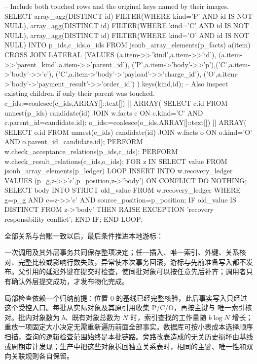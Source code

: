 \begin{BookCode}
 -- Include both touched rows and the original keys named by their images.
 SELECT array_agg(DISTINCT id) FILTER(WHERE kind='P' AND id IS NOT NULL),
        array_agg(DISTINCT id) FILTER(WHERE kind='C' AND id IS NOT NULL),
        array_agg(DISTINCT id) FILTER(WHERE kind='O' AND id IS NOT NULL)
 INTO p_ids,c_ids,o_ids
 FROM jsonb_array_elements(p_facts) a(item)
 CROSS JOIN LATERAL (VALUES
   (a.item->>'kind',a.item->>'id'),
   (a.item->>'parent_kind',a.item->>'parent_id'),
   ('P',a.item->'body'->>'p'),('C',a.item->'body'->>'c'),
   ('C',a.item->'body'->'payload'->>'charge_id'),
   ('O',a.item->'body'->'payment_result'->>'order_id')
 ) keys(kind,id);
 -- Also inspect existing children if only their parent was touched.
 c_ids:=coalesce(c_ids,ARRAY[]::text[]) || ARRAY(
   SELECT c.id FROM unnest(p_ids) candidate(id)
   JOIN w.facts c ON c.kind='C' AND c.parent_id=candidate.id);
 o_ids:=coalesce(o_ids,ARRAY[]::text[]) || ARRAY(
   SELECT o.id FROM unnest(c_ids) candidate(id)
   JOIN w.facts o ON o.kind='O' AND o.parent_id=candidate.id);
 PERFORM w.check_acceptance_relations(p_ids,c_ids);
 PERFORM w.check_result_relations(c_ids,o_ids);
 FOR z IN SELECT value FROM jsonb_array_elements(p_ledger) LOOP
   INSERT INTO w.recovery_ledger VALUES
     (p_g,z->>'c',p_position,z->'body') ON CONFLICT DO NOTHING;
   SELECT body INTO STRICT old_value FROM w.recovery_ledger
    WHERE g=p_g AND c=z->>'c' AND source_position=p_position;
   IF old_value IS DISTINCT FROM z->'body' THEN
     RAISE EXCEPTION 'recovery responsibility conflict';
   END IF;
 END LOOP;
\end{BookCode}

全部关系与台账一致以后，最后条件推进本地游标：


一次调用及其外层事务共同保存整项决定；任一插入、唯一索引、外键、关系核对、完整比较或影响行数失败，异常使本次事务回滚，游标与先前准备写入都不发布。父引用的延迟外键在提交时检查，使同批对象可以按任意先后补齐；调用者只有确认外层提交成功，才发布物化完成。

局部检查依赖一个归纳前提：位置 0 的基线已经完整核验，此后事实写入只经过这个受控入口。每批从实际对象及其原引用收集 P/C/O，再按主键与  唯一索引核对。批内对象数为 $b$、既有对象总数为 $N$ 时，索引查找的工作量随 $b\log N$ 增长；重放一项固定大小决定无需重新遍历前面全部事实。数据库可按小表成本选择顺序扫描，查询的逻辑检查范围始终是本批链路。旁路改表造成的无关历史损坏由基线或周期审计发现；生产中把这些对象拆回独立关系表时，相同的主键、唯一性和双向关联规则各自保留。

